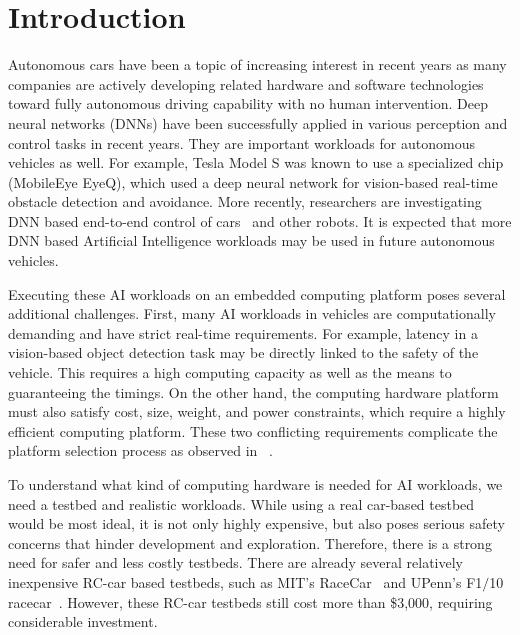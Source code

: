 \section{Introduction} \label{sec:intro}

%
%
Autonomous cars have been a topic of increasing interest in recent
years as many companies are actively developing related hardware
and software technologies toward fully autonomous driving capability with
no human intervention. Deep neural networks (DNNs) have been
successfully applied in various perception and control tasks in
recent years.  They are important workloads for autonomous vehicles
as well. For example, Tesla Model S was known to use a specialized
chip (MobileEye EyeQ), which used a deep neural network for vision-based
real-time obstacle detection and avoidance. More recently, researchers
are investigating DNN based end-to-end control of
cars~\cite{Bojarski2016} and other robots. It is expected that more
DNN based Artificial Intelligence workloads may be used in future
autonomous vehicles.

Executing these AI workloads on an embedded computing platform 
poses several additional challenges. First, many AI workloads in vehicles 
are computationally demanding and have strict real-time requirements. 
For example, latency in a vision-based object
detection task may be directly linked to the safety of the vehicle. This
requires a high computing capacity as well as the means to guaranteeing
the timings. On the other hand, the computing hardware platform must
also satisfy cost, size, weight, and power constraints, which require a
highly efficient computing platform. These two conflicting
requirements  complicate the platform selection process as observed in
~\cite{Otterness2017}.


To understand what kind of computing hardware is needed for AI
workloads, we need a testbed and realistic workloads. While using a real 
car-based testbed would be most ideal, it is not only highly expensive, but also
poses serious safety concerns that hinder development and exploration.
Therefore, there is a strong need for safer and less costly
testbeds. There are already several relatively inexpensive RC-car
based testbeds, such as MIT's 
RaceCar~\cite{shin2017project} and UPenn's F1$/$10 racecar~\cite{upennf1tenth}.
However, these RC-car testbeds still cost more than \$3,000, requiring
considerable investment.

